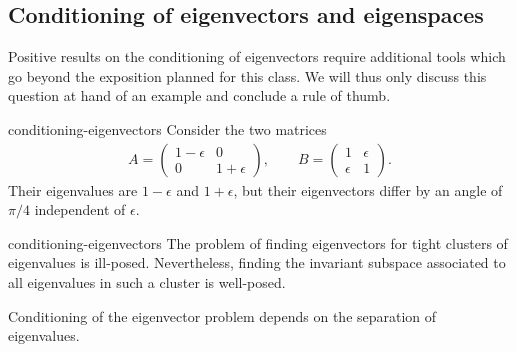 \subsection{Conditioning of eigenvectors and eigenspaces}

\begin{intro}
  Positive results on the conditioning of eigenvectors require
  additional tools which go beyond the exposition planned for this
  class. We will thus only discuss this question at hand of an example
  and conclude a rule of thumb.
\end{intro}

\begin{Example}{conditioning-eigenvectors}
  Consider the two matrices
  \begin{gather}
    A =
    \begin{pmatrix}
      1-\epsilon & 0\\ 0 & 1+\epsilon
    \end{pmatrix},
    \qquad
    B =
    \begin{pmatrix}
      1&\epsilon\\\epsilon&1
    \end{pmatrix}.
  \end{gather}
  Their eigenvalues are $1-\epsilon$ and $1+\epsilon$, but their
  eigenvectors differ by an angle of $\pi/4$ independent of
  $\epsilon$.
\end{Example}

\begin{Remark}{conditioning-eigenvectors}
  The problem of finding eigenvectors for tight clusters of
  eigenvalues is ill-posed. Nevertheless, finding the invariant
  subspace associated to all eigenvalues in such a cluster is
  well-posed.

  Conditioning of the eigenvector problem depends on the separation of
  eigenvalues.
\end{Remark}


